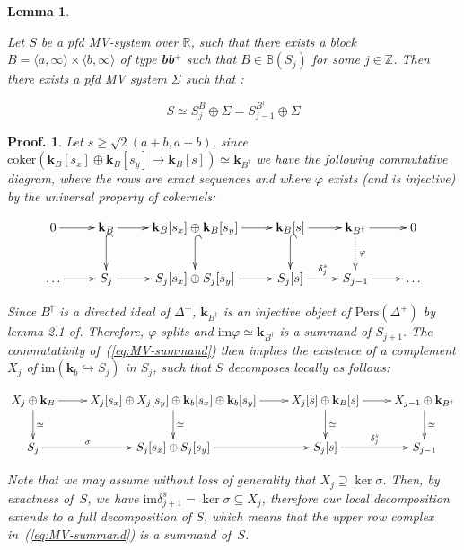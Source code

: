 \documentclass[a4paper, english, 11pt]{article}
\newcommand{\kk}[0]{\textbf{k}}
\newcommand{\Pe}{\text{Pers}}
\newcommand{\0}{\vec{0}}
\newcommand{\R}[0]{\mathbb{R}}
\newcommand{\Z}[0]{\mathbb{Z}}
\newtheorem*{pf}{Proof.} }
\newtheorem{lem}[prop]{Lemma}
\begin{document}
\begin{lem}\label{lem:splitbb+}

Let $S$ be a pfd MV-system over $\R$, such that there exists  a block $B = \langle a,\infty \rangle \times \langle b, \infty \rangle$ of type \textbf{bb$^+$} such that $B\in\mathbb{B}(S_{j})$ for some $j\in\Z$. Then there exists a pfd MV system $\Sigma$ such that : 

$$ S \simeq S_{j}^{B} \oplus \Sigma = S_{j-1}^{B^\dag} \oplus \Sigma  $$
\end{lem}

\begin{pf}
Let $s \geq \sqrt{2}(a+b,a+b)$, since $\text{coker}\left (\kk_B[s_x] \oplus \kk_B[s_y] \longrightarrow \kk_B[s] \right ) \simeq \kk_{B^\dag} $  we have the following commutative diagram, where the rows are exact sequences and where $\varphi$ exists (and is injective) by the universal property of cokernels: 
 
 \begin{equation}\label{eq:MV-summand}
 \begin{gathered}
 \xymatrix{0 \ar[r] & \kk_B \ar@{^{(}->}[d] \ar[r] &\kk_B[s_x] \oplus \kk_B[s_y] \ar[r] \ar@{^{(}->}[d] & \kk_B[s]\ar[r] \ar@{^{(}->}[d] & \kk_{B^\dag} \ar[r] \ar@{.>}[d]^\varphi  & 0 \\
\dots \ar[r] & S_j \ar[r] & S_j[s_x] \oplus S_j[s_y] \ar[r] & S_j[s] \ar[r]^{\delta_j^s} & S_{j-1} \ar[r]& \dots  }
\end{gathered}
\end{equation}
 
Since $B^\dag$ is a directed ideal of $\Delta^+$, $\kk_{B^\dag}$ is an injective object of $\Pe(\Delta^+)$ by lemma 2.1 of\cite{BotCra18}. Therefore, $\varphi$ splits and $\text{im} \varphi \simeq \kk_{B^\dag}$ is a summand of $S_{j+1}$.  The commutativity of~(\ref{eq:MV-summand}) then implies the existence of a complement $X_j$ of $\text{im} (\kk_b\hookrightarrow S_j)$ in $S_j$, such that $S$ decomposes locally as follows:

$$
\xymatrix{X_j \oplus \kk_B \ar^-{\simeq}[d]\ar[r] &X_j[s_x] \oplus X_j[s_y] \oplus  \kk_b[s_x] \oplus \kk_b[s_y] \ar^-{\simeq}[d]\ar[r] & X_j[s] \oplus \kk_B[s] \ar^-{\simeq}[d] \ar[r]  & X_{j-1} \oplus \kk_{B^\dag} \ar^-{\simeq}[d]\\
S_j \ar^-{\sigma}[r] & S_j[s_x] \oplus S_j[s_y] \ar[r] & S_j[s] \ar[r]^{\delta_j^s} & S_{j-1}
}$$

Note that we may assume without loss of generality that $X_j \supseteq \ker \sigma$.
Then, by exactness of~$S$, we have $\text{im} \delta_{j+1}^s = \ker \sigma\subseteq X_j$, therefore our local decomposition extends to a full decomposition of $S$, which means that the upper row complex in~(\ref{eq:MV-summand}) is a summand of~$S$.
\end{pf}
\end{document}

